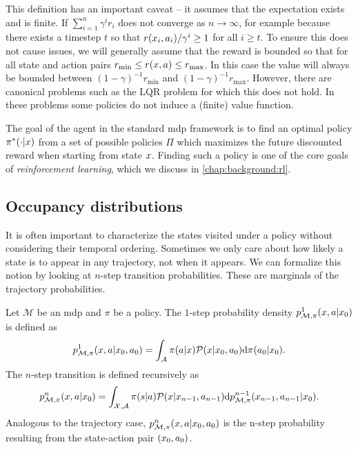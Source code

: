 This definition has an important caveat -- it assumes that the expectation exists and is finite.
If $\sum_{i=1}^n \gamma^i r_i$ does not converge as $n \rightarrow \infty$, for example because there exists a timestep $t$ so that $r(x_i,a_i)/\gamma^i \geq 1$ for all $i \geq t$.
To ensure this does not cause issues, we will generally assume that the reward is bounded so that for all state and action pairs $r_{\min} \leq r(x,a) \leq r_{\max}$.
In this case the value will always be bounded between $(1 - \gamma)^{-1} r_\mathrm{min}$ and $(1 - \gamma)^{-1} r_\mathrm{max}$.
However, there are canonical problems such as the LQR problem for which this does not hold.
In these problems some policies do not induce a (finite) value function.

The goal of the agent in the standard \ac{mdp} framework is to find an optimal policy $\pi^*(\cdot|x)$ from a set of possible policies $\Pi$ which maximizes the future discounted reward when starting from state $x$.
Finding such a policy is one of the core goals of \emph{reinforcement learning}, which we discuss in \autoref{chap:background:rl}.

\subsection{Occupancy distributions}

It is often important to characterize the states visited under a policy without considering their temporal ordering.
Sometimes we only care about how likely a state is to appear in any trajectory, not when it appears.
We can formalize this notion by looking at $n$-step transition probabilities.
These are marginals of the trajectory probabilities.

\begin{definition}
    Let $\mathcal{M}$ be an \ac{mdp}   and $\pi$ be a policy.
    The $1$-step probability density $p^1_{\mathcal{M}, \pi}(x,a|x_0)$ is defined as $$p^1_{\mathcal{M}, \pi}(x,a|x_0,a_0) = \int_{\mathcal{A}} \pi(a|x) \mathcal{P}(x|x_0,a_0) \mathrm{d} \pi(a_0|x_0).$$ 
    The $n$-step transition is defined recursively as $$p^n_{\mathcal{M}, \pi}(x,a|x_0) = \int_{\mathcal{X},\mathcal{A}} \pi(s|a) \mathcal{P}(x|x_{n-1},a_{n-1}) \mathrm{d} p^{n-1}_{\mathcal{M}, \pi}(x_{n-1},a_{n-1}|x_0) .$$
    Analogous to the trajectory case, $p^n_{\mathcal{M}, \pi}(x,a|x_0,a_0)$ is the n-step probability resulting from the state-action pair $(x_0,a_0)$.
\end{definition}

